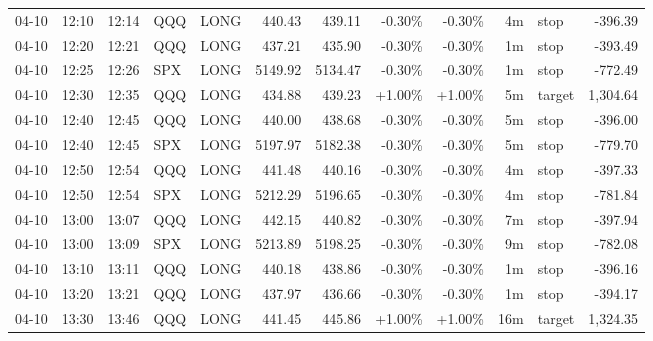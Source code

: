 \documentclass[11pt,a4paper,twoside]{article}
\begin{document}
\begin{center}
\begin{longtable}{>{\color{txtmain}}l l l l l r r r r r >{\color{txtmain}}l r}
04-10 & 12:10 & 12:14 & QQQ & LONG & 440.43 & 439.11 & \textcolor{lossred}{-0.30\%} & \textcolor{lossred}{-0.30\%} & 4m & stop & \textcolor{lossred}{-396.39} \\
04-10 & 12:20 & 12:21 & QQQ & LONG & 437.21 & 435.90 & \textcolor{lossred}{-0.30\%} & \textcolor{lossred}{-0.30\%} & 1m & stop & \textcolor{lossred}{-393.49} \\
04-10 & 12:25 & 12:26 & SPX & LONG & 5149.92 & 5134.47 & \textcolor{lossred}{-0.30\%} & \textcolor{lossred}{-0.30\%} & 1m & stop & \textcolor{lossred}{-772.49} \\
04-10 & 12:30 & 12:35 & QQQ & LONG & 434.88 & 439.23 & \textcolor{wingreen}{+1.00\%} & \textcolor{wingreen}{+1.00\%} & 5m & target & \textcolor{wingreen}{1,304.64} \\
04-10 & 12:40 & 12:45 & QQQ & LONG & 440.00 & 438.68 & \textcolor{lossred}{-0.30\%} & \textcolor{lossred}{-0.30\%} & 5m & stop & \textcolor{lossred}{-396.00} \\
04-10 & 12:40 & 12:45 & SPX & LONG & 5197.97 & 5182.38 & \textcolor{lossred}{-0.30\%} & \textcolor{lossred}{-0.30\%} & 5m & stop & \textcolor{lossred}{-779.70} \\
04-10 & 12:50 & 12:54 & QQQ & LONG & 441.48 & 440.16 & \textcolor{lossred}{-0.30\%} & \textcolor{lossred}{-0.30\%} & 4m & stop & \textcolor{lossred}{-397.33} \\
04-10 & 12:50 & 12:54 & SPX & LONG & 5212.29 & 5196.65 & \textcolor{lossred}{-0.30\%} & \textcolor{lossred}{-0.30\%} & 4m & stop & \textcolor{lossred}{-781.84} \\
04-10 & 13:00 & 13:07 & QQQ & LONG & 442.15 & 440.82 & \textcolor{lossred}{-0.30\%} & \textcolor{lossred}{-0.30\%} & 7m & stop & \textcolor{lossred}{-397.94} \\
04-10 & 13:00 & 13:09 & SPX & LONG & 5213.89 & 5198.25 & \textcolor{lossred}{-0.30\%} & \textcolor{lossred}{-0.30\%} & 9m & stop & \textcolor{lossred}{-782.08} \\
04-10 & 13:10 & 13:11 & QQQ & LONG & 440.18 & 438.86 & \textcolor{lossred}{-0.30\%} & \textcolor{lossred}{-0.30\%} & 1m & stop & \textcolor{lossred}{-396.16} \\
04-10 & 13:20 & 13:21 & QQQ & LONG & 437.97 & 436.66 & \textcolor{lossred}{-0.30\%} & \textcolor{lossred}{-0.30\%} & 1m & stop & \textcolor{lossred}{-394.17} \\
04-10 & 13:30 & 13:46 & QQQ & LONG & 441.45 & 445.86 & \textcolor{wingreen}{+1.00\%} & \textcolor{wingreen}{+1.00\%} & 16m & target & \textcolor{wingreen}{1,324.35} \\

\end{longtable}
\end{center}
\end{document}
